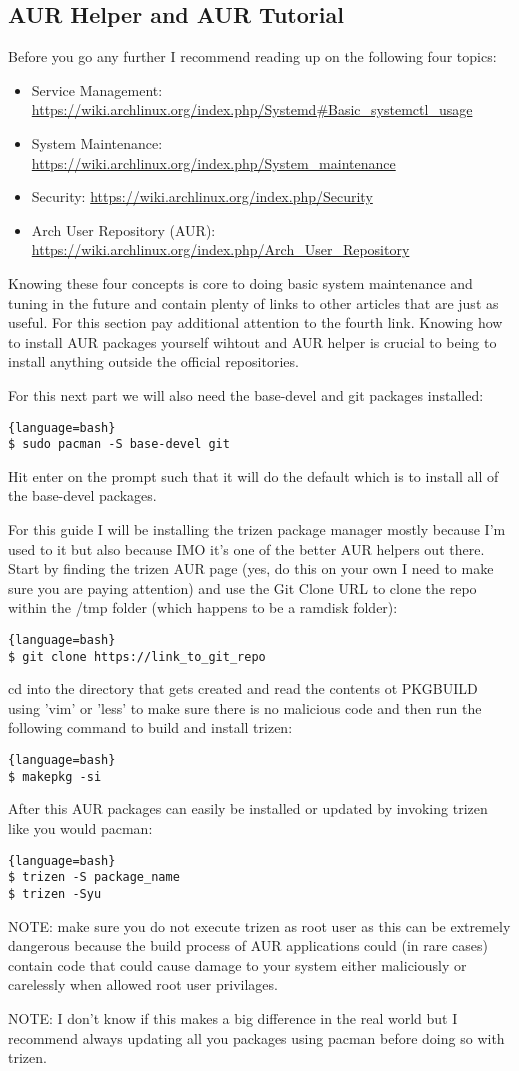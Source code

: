 \subsection{AUR Helper and AUR Tutorial}
Before you go any further I recommend reading up on the following four topics:
\begin{itemize}
    \item Service Management: \url{https://wiki.archlinux.org/index.php/Systemd#Basic_systemctl_usage}
    \item System Maintenance: \url{https://wiki.archlinux.org/index.php/System_maintenance}
    \item Security: \url{https://wiki.archlinux.org/index.php/Security}
    \item Arch User Repository (AUR): \url{https://wiki.archlinux.org/index.php/Arch_User_Repository}
\end{itemize}
Knowing these four concepts is core to doing basic system maintenance and tuning in the future and contain plenty of links to other articles that are just as useful. For this section pay additional attention to the fourth link. Knowing how to install AUR packages yourself wihtout and AUR helper is crucial to being to install anything outside the official repositories.

For this next part we will also need the base-devel and git packages installed:
\begin{lstlisting}{language=bash}
$ sudo pacman -S base-devel git
\end{lstlisting}
Hit enter on the prompt such that it will do the default which is to install all of the base-devel packages.

For this guide I will be installing the trizen package manager mostly because I'm used to it but also because IMO it's one of the better AUR helpers out there.
Start by finding the trizen AUR page (yes, do this on your own I need to make sure you are paying attention) and use the Git Clone URL to clone the repo within the /tmp folder (which happens to be a ramdisk folder):
\begin{lstlisting}{language=bash}
$ git clone https://link_to_git_repo
\end{lstlisting}
cd into the directory that gets created and read the contents ot PKGBUILD using 'vim' or 'less' to make sure there is no malicious code and then run the following command to build and install trizen:
\begin{lstlisting}{language=bash}
$ makepkg -si
\end{lstlisting}
After this AUR packages can easily be installed or updated by invoking trizen like you would pacman:
\begin{lstlisting}{language=bash}
$ trizen -S package_name
$ trizen -Syu
\end{lstlisting}
NOTE: make sure you do not execute trizen as root user as this can be extremely dangerous because the build process of AUR applications could (in rare cases) contain code that could cause damage to your system either maliciously or carelessly when allowed root user privilages.

NOTE: I don't know if this makes a big difference in the real world but I recommend always updating all you packages using pacman before doing so with trizen.




